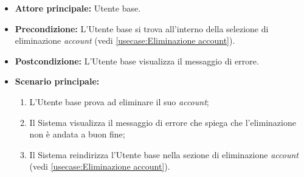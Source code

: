 \label{usecase:Errore eliminazione account}
\begin{itemize}
	\item \textbf{Attore principale:} Utente base.

	\item \textbf{Precondizione:}
	      L'Utente base si trova all'interno della selezione di eliminazione \textit{account} (vedi \autoref{usecase:Eliminazione account}).

	\item \textbf{Postcondizione:}
	      L'Utente base visualizza il messaggio di errore.

	\item \textbf{Scenario principale:}
	      \begin{enumerate}
		      \item L'Utente base prova ad eliminare il suo \textit{account};
		      \item Il Sistema visualizza il messaggio di errore che spiega che l'eliminazione non è andata a buon fine;
		      \item Il Sistema reindirizza l'Utente base nella sezione di eliminazione \textit{account} (vedi \autoref{usecase:Eliminazione account}).
	      \end{enumerate}
\end{itemize}
